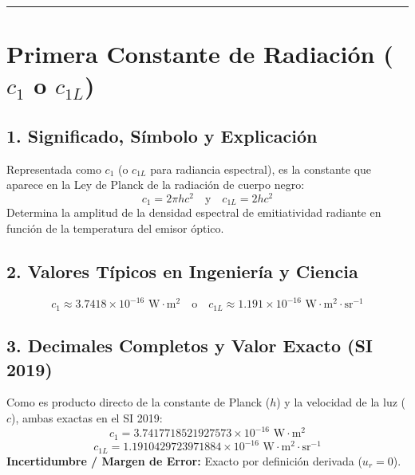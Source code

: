 \documentclass[12pt,a4paper]{article}
\begin{document}
\vspace{0.8cm}
\hrule
\vspace{0.8cm}

\section{Primera Constante de Radiación ($c_1$ o $c_{1L}$)}

\subsection*{1. Significado, Símbolo y Explicación}
Representada como $c_1$ (o $c_{1L}$ para radiancia espectral), es la constante que aparece en la Ley de Planck de la radiación de cuerpo negro:
\begin{equation*}
c_1 = 2\pi h c^2 \quad \text{y} \quad c_{1L} = 2 h c^2
\end{equation*}
Determina la amplitud de la densidad espectral de emitiatividad radiante en función de la temperatura del emisor óptico.

\subsection*{2. Valores Típicos en Ingeniería y Ciencia}
\begin{equation*}
c_1 \approx 3.7418 \times 10^{-16} \text{ W}\cdot\text{m}^2 \quad \text{o} \quad c_{1L} \approx 1.191 \times 10^{-16} \text{ W}\cdot\text{m}^2\cdot\text{sr}^{-1}
\end{equation*}

\subsection*{3. Decimales Completos y Valor Exacto (SI 2019)}
Como es producto directo de la constante de Planck ($h$) y la velocidad de la luz ($c$), ambas exactas en el SI 2019:
\begin{equation*}
c_1 = 3.7417718521927573 \times 10^{-16} \text{ W}\cdot\text{m}^2
\end{equation*}
\begin{equation*}
c_{1L} = 1.1910429723971884 \times 10^{-16} \text{ W}\cdot\text{m}^2\cdot\text{sr}^{-1}
\end{equation*}
\textbf{Incertidumbre / Margen de Error:} Exacto por definición derivada ($u_r = 0$).
\end{document}
